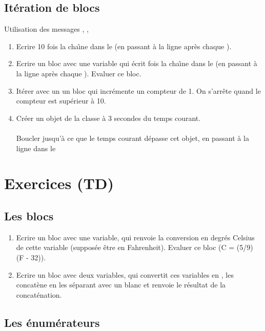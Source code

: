\subsection{It\'eration de blocs}

Utilisation des messages , ,

\begin{enumerate}
\item Ecrire 10 fois la cha\^{\i}ne  dans le 
(en passant \`a la ligne apr\`es chaque ).

\item Ecrire un bloc avec une variable  qui \'ecrit  fois la cha\^{\i}ne  dans le 
(en passant \`a la ligne apr\`es chaque ). Evaluer ce bloc.

\item It\'erer avec un  un bloc qui incr\'emente un compteur de 1.
On s'arr\^ete quand le compteur est sup\'erieur \`a 10.
\item
Cr\'eer un objet de la classe  \`a 3 secondes du temps courant.\\
\\
Boucler jusqu'\`a ce que le temps courant d\'epasse cet objet,
en passant \`a la ligne dans le 
\end{enumerate}

\section{Exercices (TD)}

\subsection{Les blocs}
\begin{enumerate}
\item
Ecrire un bloc avec une variable, qui renvoie la conversion en degr\'es
Celsius de cette variable (suppos\'ee \^etre en Fahrenheit).
Evaluer ce bloc (C = (5/9) (F - 32)).
\item
Ecrire un bloc avec deux variables, qui convertit ces variables en
, les concat\`ene en les s\'eparant avec un blanc
et renvoie le r\'esultat de la concat\'enation.
\end{enumerate}


\subsection{Les \'enum\'erateurs}

